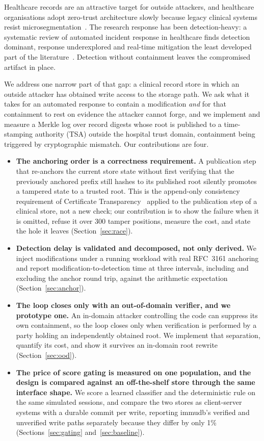 \documentclass[conference]{IEEEtran}
\begin{document}
Healthcare records are an attractive target for outside attackers, and healthcare organisations adopt
zero-trust architecture slowly because legacy clinical systems resist microsegmentation~\cite{tyler}. The
research response has been detection-heavy: a systematic review of automated incident response in healthcare
finds detection dominant, response underexplored and real-time mitigation the least developed part of the
literature~\cite{khandre}. Detection without containment leaves the compromised artifact in place.

We address one narrow part of that gap: a clinical record store in which an outside attacker has obtained
write access to the storage path. We ask what it takes for an automated response to contain a modification
\emph{and} for that containment to rest on evidence the attacker cannot forge, and we implement and measure a
Merkle log over record digests whose root is published to a time-stamping authority (TSA) outside the hospital
trust domain, containment being triggered by cryptographic mismatch. Our contributions are four.

\begin{itemize}
\item \textbf{The anchoring order is a correctness requirement.} A publication step that re-anchors
the current store state without first verifying that the previously anchored prefix still hashes to its
published root silently promotes a tampered state to a trusted root. This is the append-only consistency
requirement of Certificate Transparency~\cite{rfc6962} applied to the publication step of a clinical store, not
a new check; our contribution is to show the failure when it is omitted, refuse it over 300 tamper positions,
measure the cost, and state the hole it leaves (Section~\ref{sec:race}).
\item \textbf{Detection delay is validated and decomposed, not only derived.} We inject modifications under a
running workload with real RFC~3161 anchoring and report modification-to-detection time at three intervals,
including and excluding the anchor round trip, against the arithmetic expectation (Section~\ref{sec:anchor}).
\item \textbf{The loop closes only with an out-of-domain verifier, and we prototype one.} An
in-domain attacker controlling the code can suppress its own containment, so the loop closes only when
verification is performed by a party holding an independently obtained root. We implement that
separation, quantify its cost, and show it survives an in-domain root rewrite (Section~\ref{sec:ood}).
\item \textbf{The price of score gating is measured on one population, and the design is compared
against an off-the-shelf store through the same interface shape.} We score a learned classifier and the
deterministic rule on the same simulated sessions, and compare the two stores as client-server systems
with a durable commit per write, reporting immudb's verified and unverified write paths separately because
they differ by only 1\% (Sections~\ref{sec:gating} and~\ref{sec:baseline}).
\end{itemize}
\end{document}
